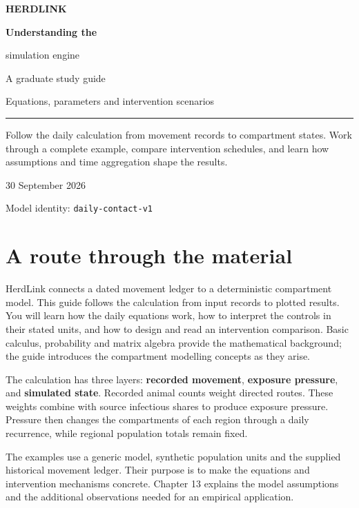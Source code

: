 \documentclass[11pt,a4paper]{article}
\begin{document}
\hypersetup{pageanchor=false}
\begin{titlepage}
\color{Ink}
{\large\sffamily\bfseries\color{Teal}HERDLINK\par}
\vspace{30mm}
{\Huge\sffamily\bfseries Understanding the\par simulation engine\par}
\vspace{7mm}
{\Large\sffamily A graduate study guide\par}
\vspace{12mm}
{\large Equations, parameters and intervention scenarios\par}
\vspace{15mm}
\rule{\linewidth}{0.5pt}
\vspace{4mm}
Follow the daily calculation from movement records to compartment states.
Work through a complete example, compare intervention schedules, and learn
how assumptions and time aggregation shape the results.
\vfill
{\sffamily\color{Muted}30 September 2026\par
Model identity: \texttt{daily-contact-v1}\par}
\end{titlepage}
\hypersetup{pageanchor=true}
\tableofcontents
\clearpage
{}
\section{A route through the
material}\label{a-route-through-the-material}

HerdLink connects a dated movement ledger to a deterministic compartment
model. This guide follows the calculation from input records to plotted
results. You will learn how the daily equations work, how to interpret
the controls in their stated units, and how to design and read an
intervention comparison. Basic calculus, probability and matrix algebra
provide the mathematical background; the guide introduces the
compartment modelling concepts as they arise.

The calculation has three layers: \textbf{recorded movement},
\textbf{exposure pressure}, and \textbf{simulated state}. Recorded
animal counts weight directed routes. These weights combine with source
infectious shares to produce exposure pressure. Pressure then changes
the compartments of each region through a daily recurrence, while
regional population totals remain fixed.

The examples use a generic model, synthetic population units and the
supplied historical movement ledger. Their purpose is to make the
equations and intervention mechanisms concrete. Chapter 13 explains the
model assumptions and the additional observations needed for an
empirical application.
\end{document}
